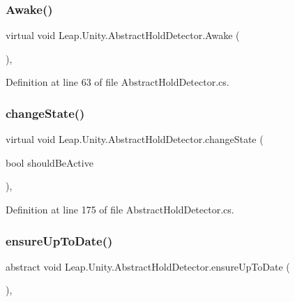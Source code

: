 \subsubsection{\texorpdfstring{Awake()}{Awake()}}
{\footnotesize\ttfamily virtual void Leap.\+Unity.\+Abstract\+Hold\+Detector.\+Awake (\begin{DoxyParamCaption}{ }\end{DoxyParamCaption})\hspace{0.3cm}{\ttfamily [protected]}, {\ttfamily [virtual]}}



Definition at line 63 of file Abstract\+Hold\+Detector.\+cs.

\mbox{\label{class_leap_1_1_unity_1_1_abstract_hold_detector_a6bca8f8ac18c3ca93c3d4a5b9584477c}} 
\subsubsection{\texorpdfstring{changeState()}{changeState()}}
{\footnotesize\ttfamily virtual void Leap.\+Unity.\+Abstract\+Hold\+Detector.\+change\+State (\begin{DoxyParamCaption}\item[{bool}]{should\+Be\+Active }\end{DoxyParamCaption})\hspace{0.3cm}{\ttfamily [protected]}, {\ttfamily [virtual]}}



Definition at line 175 of file Abstract\+Hold\+Detector.\+cs.

\mbox{\label{class_leap_1_1_unity_1_1_abstract_hold_detector_a89541e346c0eb1a0212944c94e407b82}} 
\subsubsection{\texorpdfstring{ensureUpToDate()}{ensureUpToDate()}}
{\footnotesize\ttfamily abstract void Leap.\+Unity.\+Abstract\+Hold\+Detector.\+ensure\+Up\+To\+Date (\begin{DoxyParamCaption}{ }\end{DoxyParamCaption})\hspace{0.3cm}{\ttfamily [protected]}, {}}

